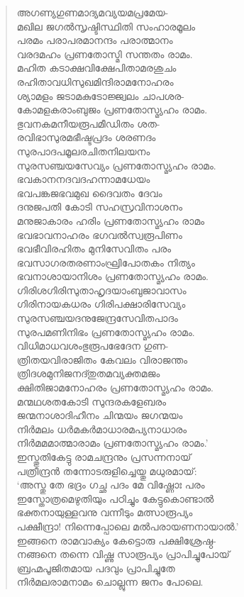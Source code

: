 \begin{verse}
അഗണ്യഗുണമാദ്യമവ്യയമപ്രമേയ-\\
മഖില ജഗല്‍സൃഷ്ടിസ്ഥിതി സംഹാരമൂലം\\
പരമം പരാപരമാനന്ദം പരാത്മാനം\\
വരദമഹം പ്രണതോസ്മി സന്തതം രാമം.\\
മഹിത കടാക്ഷവിക്ഷേപിതാമരശുചം\\
രഹിതാവധിസുഖമിന്ദിരാമനോഹരം\\
ശ്യാമളം ജടാമകുടോജ്ജ്വലം ചാപശര-\\
കോമളകരാംബുജം പ്രണതോസ്മ്യഹം രാമം.\\
ഭുവനകമനീയരൂപമീഡിതം ശത-\\
രവിഭാസുരമഭീഷ്ടപ്രദം ശരണദം\\
സുരപാദപമൂലരചിതനിലയനം\\
സുരസഞ്ചയസേവ്യം പ്രണതോസ്മ്യഹം രാമം.\\
ഭവകാനനദവദഹന്നാമധേയം\\
ഭവപങ്കജഭവമുഖ ദൈവതം ദേവം\\
ദനുജപതി കോടി സഹസ്രവിനാശനം\\
മനുജാകാരം ഹരിം പ്രണതോസ്മ്യഹം രാമം\\
ഭവഭാവനാഹരം ഭഗവല്‍സ്വരൂപിണം\\
ഭവഭീവിരഹിതം മുനിസേവിതം പരം\\
ഭവസാഗരതരണാംഘ്രിപോതകം നിത്യം\\
ഭവനാശായാനിശം പ്രണതോസ്മ്യഹം രാമം.\\
ഗിരിശഗിരിസുതാഹൃദയാംബുജാവാസം\\
ഗിരിനായകധരം ഗിരിപക്ഷാരിസേവ്യം\\
സുരസഞ്ചയദനുജേന്ദ്രസേവിതപാദം\\
സുരപമണിനിഭം പ്രണതോസ്മ്യഹം രാമം.\\
വിധിമാധവശംഭുരൂപഭേദേന ഗുണ-\\
ത്രിതയവിരാജിതം കേവലം വിരാജന്തം\\
ത്രിദശമുനിജനദ്തുതമവ്യക്തമജം\\
ക്ഷിതിജാമനോഹരം പ്രണതോസ്മ്യഹം രാമം.\\
മന്മഥശതകോടി സുന്ദരകളേബരം\\
ജന്മനാശാദിഹീനം ചിന്മയം ജഗന്മയം\\
നിര്‍മലം ധര്‍മകര്‍മാധാരമപ്യനാധാരം\\
നിര്‍മമമാത്മാരാമം പ്രണതോസ്മ്യഹം രാമം.’\\
ഇസ്തുതികേട്ടു രാമചന്ദ്രനും പ്രസന്നനായ്\\
പത്രീന്ദ്രന്‍ തന്നോടരുളിച്ചെയ്തു മധുരമായ്:\\
‘അസ്തു തേ ഭദ്രം ഗച്ഛ പദം മേ വിഷ്ണോഃ പരം\\
ഇസ്തോത്രമെഴുതിയും പഠിച്ചും കേട്ടുകൊണ്ടാല്‍\\
ഭക്തനായുള്ളവനു വന്നീടും മത്സാരൂപ്യം\\
പക്ഷീന്ദ്രാ! നിന്നെപ്പോലെ മല്‍പരായണനായാല്‍.’\\
ഇങ്ങനെ രാമവാക്യം കേട്ടൊരു പക്ഷിശ്രേഷ്ഠ-\\
നങ്ങനെ തന്നെ വിഷ്ണു സാരൂപ്യം പ്രാപിച്ചുപോയ്\\
ബ്രഹ്മപൂജിതമായ പദവും പ്രാപിച്ചുതേ\\
നിര്‍മലരാമനാമം ചൊല്ലുന്ന ജനം പോലെ.
\end{verse}

